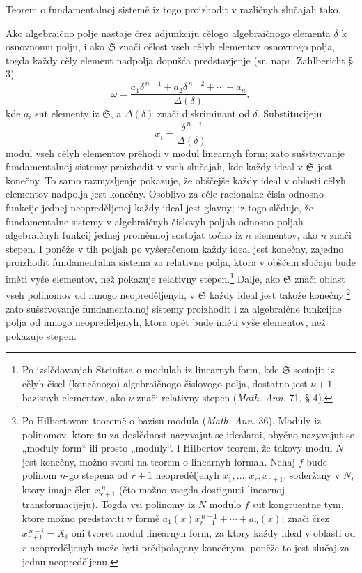 \documentclass[11pt]{article}
\providecommand{\frS}{\mathfrak S}
\begin{document}
Teorem o fundamentalnoj sistemě iz togo proizhodit v različnyh slučajah tako.

Ako algebraično polje nastaje črez adjunkciju cělogo algebraičnogo elementa \(\delta\) k osnovnomu polju, i ako \(\frS\) znači cělost vseh cělyh elementov osnovnogo polja, togda každy cěly element nadpolja dopušća predstavjenje (sr. napr. Zahlbericht § 3)
\[
\omega=\frac{a_1\delta^{\,n-1}+a_2\delta^{\,n-2}+\cdots+a_n}{\Delta(\delta)},
\]
kde \(a_i\) sut elementy iz \(\frS\), a \(\Delta(\delta)\) znači diskriminant od \(\delta\). Substitucijeju
\[
x_i=\frac{\delta^{\,n-i}}{\Delta(\delta)}
\]
modul vseh cělyh elementov prěhodi v modul linearnyh form; zato sušstvovanje fundamentalnoj sistemy proizhodit v vseh slučajah, kde každy ideal v \(\frS\) jest konečny. To samo razmysljenje pokazuje, že obščejše každy ideal v oblasti cělyh elementov nadpolja jest konečny. Osoblivo za cěle racionalne čisla odnosno funkcije jednej neopreděljenej každy ideal jest glavny; iz togo slěduje, že fundamentalne sistemy v algebraičnyh čislovyh poljah odnosno poljah algebraičnyh funkcij jednej proměnnoj sostojat točno iz \(n\) elementov, ako \(n\) znači stepen. I poněže v tih poljah po vyšerečenom každy ideal jest konečny, zajedno proizhodit fundamentalna sistema za relativne polja, ktora v obščem slučaju bude iměti vyše elementov, než pokazuje relativny stepen.\footnote{Po izslědovanjah Steinitza o modulah iz linearnyh form, kde \(\frS\) sostojit iz cělyh čisel (konečnogo) algebraičnogo čislovogo polja, dostatno jest \(\nu+1\) bazisnyh elementov, ako \(\nu\) znači relativny stepen (\emph{Math. Ann.} 71, § 4).} Dalje, ako \(\frS\) znači oblast vseh polinomov od mnogo neopreděljenyh, v \(\frS\) každy ideal jest takože konečny;\footnote{Po Hilbertovom teoremě o bazisu modula (\emph{Math. Ann.} 36). Moduly iz polinomov, ktore tu za doslědnost nazyvajut se idealami, obyčno nazyvajut se „moduly form“ ili prosto „moduly“. I Hilbertov teorem, že takovy modul \(N\) jest konečny, možno svesti na teorem o linearnyh formah. Nehaj \(f\) bude polinom \(n\)-go stepena od \(r+1\) neopreděljenyh \(x_1,\ldots,x_r,x_{r+1}\), soderžany v \(N\), ktory imaje člen \(x_{r+1}^{\,n}\) (čto možno vsegda dostignuti linearnoj transformacijeju). Togda vsi polinomy iz \(N\) modulo \(f\) sut kongruentne tym, ktore možno predstaviti v formě \(a_1(x)x_{r+1}^{\,n-1}+\cdots+a_n(x)\); znači črez \(x_{r+1}^{\,n-i}=X_i\) oni tvoret modul linearnyh form, za ktory každy ideal v oblasti od \(r\) neopreděljenyh može byti prědpolagany konečnym, poněže to jest slučaj za jednu neopreděljenu.} zato sušstvovanje fundamentalnoj sistemy proizhodit i za algebraične funkcijne polja od mnogo neopreděljenyh, ktora opět bude iměti vyše elementov, než pokazuje stepen.
\end{document}
